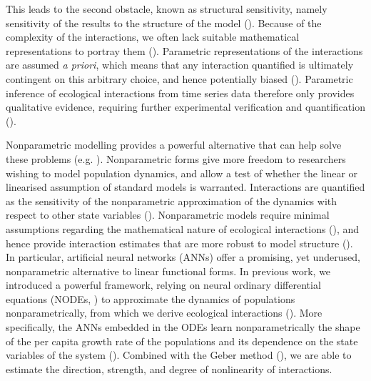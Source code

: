 \documentclass[11pt, oneside]{article}
\begin{document}
This leads to the second obstacle, known as structural sensitivity, namely sensitivity of the results to the structure of the model (\cite{Wood2001,Adamson2013}).
Because of the complexity of the interactions, we often lack suitable mathematical representations to portray them (\cite{Jost2000,Wood2001,Ellner2002,Wu2005}).
Parametric representations of the interactions are assumed \textit{a priori}, which means that any interaction quantified is ultimately contingent on this arbitrary choice, and hence potentially biased (\cite{Jost2000,Wood2001,Ellner2002,Wu2005}).
Parametric inference of ecological interactions from time series data therefore only provides qualitative evidence, requiring further experimental verification and quantification (\cite{Kendall1999}). 

Nonparametric modelling provides a powerful alternative that can help solve these problems (e.g. \cite{Jost2000,Wood2001,Ellner2002,Wu2005,Pasquali2018}).
Nonparametric forms give more freedom to researchers wishing to  model population dynamics, and allow a test of whether the linear or linearised assumption of standard models is warranted.
Interactions are quantified as the sensitivity of the nonparametric approximation of the dynamics with respect to other state variables (\cite{Sugihara2012,Ushio2018}).
Nonparametric models require minimal assumptions regarding the mathematical nature of ecological interactions (\cite{Jost2000,Gross2005}), and hence provide interaction estimates that are more robust to model structure (\cite{Wood2001}).
In particular, artificial neural networks (ANNs) offer a promising, yet underused, nonparametric alternative to linear functional forms.
In previous work, we introduced a powerful framework, relying on neural ordinary differential equations (NODEs, \cite{Chen2018}) to approximate the dynamics of populations nonparametrically, from which we derive ecological interactions (\cite{Bonnaffe2021a}).
More specifically, the ANNs embedded in the ODEs learn nonparametrically the shape of the per capita growth rate of the populations and its dependence on the state variables of the system (\cite{Bonnaffe2021a}).
Combined with the Geber method (\cite{Hairston2005}), we are able to estimate the direction, strength, and degree of nonlinearity of interactions.
\end{document}
